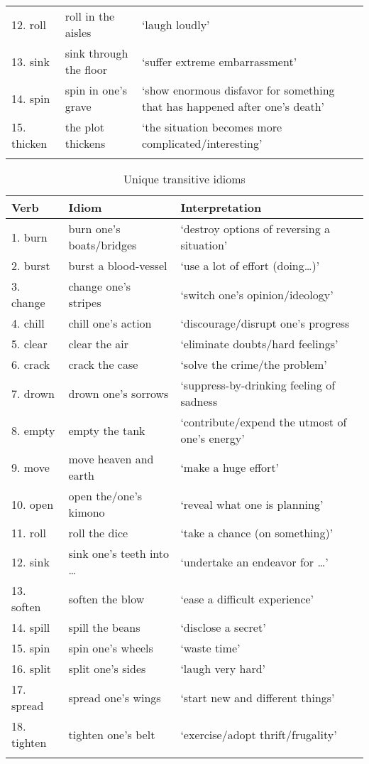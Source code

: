 \documentclass[output=paper]{langsci/langscibook}
\begin{document}
\begin{paperappendix}
\begin{table}[H]
\begin{tabularx}{\textwidth}{llQ}
{12. roll}  & roll in the aisles & ‘laugh loudly’ \\
{13. sink} & sink through the floor & ‘suffer extreme embarrassment’\\
{14. spin}  & spin in one’s grave & ‘show enormous disfavor for something that has happened after one's death’\\
{15. thicken}  & the plot thickens & ‘the situation becomes more complicated\slash  interesting’\\
\lspbottomrule
\end{tabularx}
\end{table}

\begin{table}[H]
\small
\caption{Unique transitive idioms}
\begin{tabularx}{\textwidth}{llQ}
\lsptoprule
{Verb} & {Idiom} & {Interpretation} \\
\midrule
{1. burn}  & burn one’s boats/bridges & ‘destroy options of reversing a situation’ \\
{2. burst}  & burst a blood-vessel & ‘use a lot of effort (doing…)’\\
{3. change} & change one’s stripes~ & ‘switch one’s opinion/ideology’ \\
{4. chill}  & chill one’s action & ‘discourage/disrupt one’s progress \\
{5. clear}  & clear the air & ‘eliminate doubts/hard feelings’\\
{6. crack}  & crack the case & ‘solve the crime/the problem’ \\
{7. drown}  & drown one’s sorrows & ‘suppress-by-drinking feeling of sadness\\
{8. empty}  & empty the tank & ‘contribute/expend the utmost of one’s energy’ \\
{9. move}  & move heaven and earth & ‘make a huge effort’ \\
{10. open}  & open the/one’s kimono & ‘reveal what one is planning’\\
{11. roll}  & roll the dice & ‘take a chance (on something)’ \\
{12. sink}  & sink one’s teeth into \dots & ‘undertake an endeavor for \dots’\\
{13. soften}  & soften the blow & ‘ease a difficult experience’ \\
{14. spill}  & spill the beans & ‘disclose a secret’ \\
{15. spin}  & spin one’s wheels & ‘waste time’\\
{16. split}  & split one’s sides & ‘laugh very hard’\\
{17. spread}  & spread one’s wings & ‘start new and different things’  \\
{18. tighten} & tighten one’s belt & ‘exercise/adopt thrift/frugality’\\
\lspbottomrule
\end{tabularx}
\end{table}


\end{paperappendix}
\end{document}
